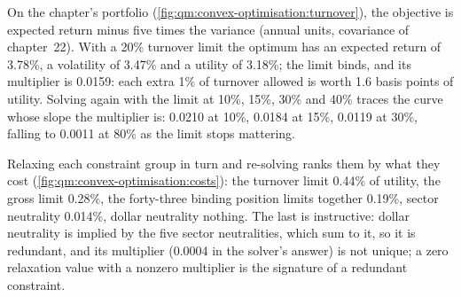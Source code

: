 On the chapter's portfolio (\cref{fig:qm:convex-optimisation:turnover}), the objective is expected return minus five times the variance (annual units, covariance of
chapter~22). With a 20\% turnover limit the optimum has an expected return of 3.78\%, a volatility of 3.47\% and a utility of 3.18\%; the limit binds, and its multiplier is
0.0159: each extra 1\% of turnover allowed is worth 1.6 basis points of utility. Solving again with the limit at 10\%, 15\%, 30\% and 40\% traces the curve whose slope the
multiplier is: 0.0210 at 10\%, 0.0184 at 15\%, 0.0119 at 30\%, falling to 0.0011 at 80\% as the limit stops mattering.

\begin{omfigure}

\label{fig:qm:convex-optimisation:turnover}
\end{omfigure}

Relaxing each constraint group in turn and re-solving ranks them by what they cost (\cref{fig:qm:convex-optimisation:costs}): the turnover limit 0.44\% of utility, the gross
limit 0.28\%, the forty-three binding position limits together 0.19\%, sector neutrality 0.014\%, dollar neutrality nothing. The last is instructive: dollar neutrality is
implied by the five sector neutralities, which sum to it, so it is redundant, and its multiplier (0.0004 in the solver's answer) is not unique; a zero relaxation value with a
nonzero multiplier is the signature of a redundant constraint.

